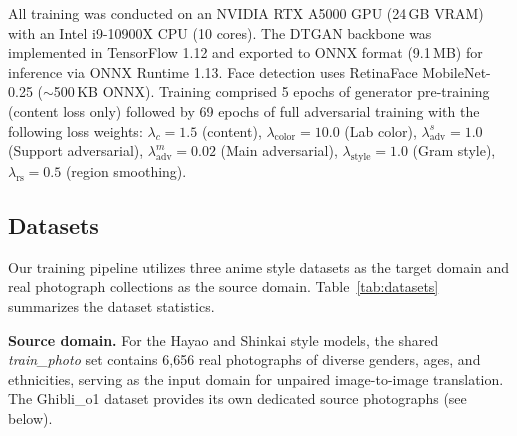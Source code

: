 \documentclass[journal]{IEEEtran}
\begin{document}
All training was conducted on an NVIDIA RTX A5000 GPU (24\,GB VRAM) with an Intel i9-10900X CPU (10 cores). The DTGAN backbone was implemented in TensorFlow 1.12 and exported to ONNX format (9.1\,MB) for inference via ONNX Runtime 1.13. Face detection uses RetinaFace MobileNet-0.25 ($\sim$500\,KB ONNX). Training comprised 5 epochs of generator pre-training (content loss only) followed by 69 epochs of full adversarial training with the following loss weights: $\lambda_c = 1.5$ (content), $\lambda_{\text{color}} = 10.0$ (Lab color), $\lambda_{\text{adv}}^s = 1.0$ (Support adversarial), $\lambda_{\text{adv}}^m = 0.02$ (Main adversarial), $\lambda_{\text{style}} = 1.0$ (Gram style), $\lambda_{\text{rs}} = 0.5$ (region smoothing).

\subsection{Datasets}

Our training pipeline utilizes three anime style datasets as the target domain and real photograph collections as the source domain. Table~\ref{tab:datasets} summarizes the dataset statistics.

\textbf{Source domain.} For the Hayao and Shinkai style models, the shared \textit{train\_photo} set contains 6,656 real photographs of diverse genders, ages, and ethnicities, serving as the input domain for unpaired image-to-image translation. The Ghibli\_o1 dataset provides its own dedicated source photographs (see below).
\end{document}

